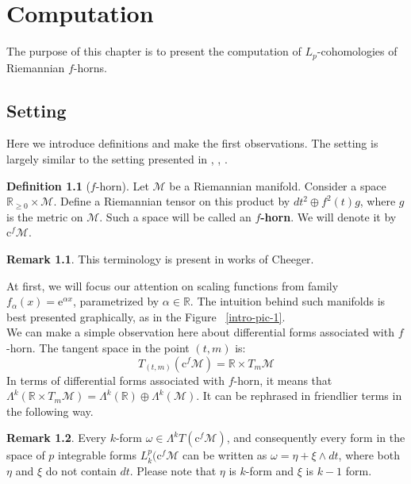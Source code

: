 \documentclass[licencjacka]{pracamgr}
\theoremstyle{definition}
\newtheorem{definition}{Definition}[section]
\theoremstyle{definition}
\newtheorem{remark}{Remark}[section]
\theoremstyle{plain}
\theoremstyle{plain}
\begin{document}
\chapter{Computation}

The purpose of this chapter is to present the computation of
$L_p$-cohomologies of Riemannian $f$-horns.

\section{Setting}
Here we introduce definitions and make the first observations. The setting
is largely similar to the setting presented in \cite{weber}, \cite{youssin},
\cite{cheeger}. \\

\begin{definition}[$f$-horn]
Let $\mathcal{M}$ be a Riemannian manifold. Consider a space $
\mathbb{R}_{\geq 0} \times \mathcal{M}$.  Define a Riemannian tensor
on this product by $dt^2 \oplus f^{2}(t)g $, where $g$ is the metric
on $\mathcal{M}$.  Such a space will be called an
\textbf{$f$-horn}. We will denote it by $\mathrm{c}^f \mathcal{M}$. \\
\end{definition}

\begin{remark}
This terminology is present in works of Cheeger.
\end{remark}

At first, we will focus our attention on scaling functions from family
$f_\alpha(x) = \mathrm{e}^{\alpha x}$, parametrized by $\alpha \in
\mathbb{R}$.  The intuition behind such manifolds is best presented
graphically, as in the Figure ~\ref{intro-pic-1}. \\


We can make a simple observation here about differential forms associated with
$f$-horn. The tangent space in the point $(t, m)$ is:
\[
    T_{(t, m)} (\mathrm{c}^f \mathcal{M}) = \mathbb{R} \times T_m \mathcal{M}
\]
In terms of differential forms associated with $f$-horn, it means that
$\Lambda^k(\mathbb{R} \times T_m \mathcal{M}) = 
\Lambda^k(\mathbb{R})  \oplus \Lambda^k(\mathcal{M}) $.
It can be rephrased in friendlier terms in the following way.

\begin{remark}
Every $k$-form $\omega \in \Lambda^k T(\mathrm{c}^f \mathcal{M})$, and
consequently every form in the space of $p$ integrable forms $L_k^p
(\mathrm{c}^f \mathcal{M}$ can be written as $\omega = \eta + \xi
\wedge dt$, where both $\eta$ and $\xi$ do not contain $dt$.  Please
note that $\eta$ is $k$-form and $\xi$ is $k-1$ form.
\end{remark}
\end{document}
